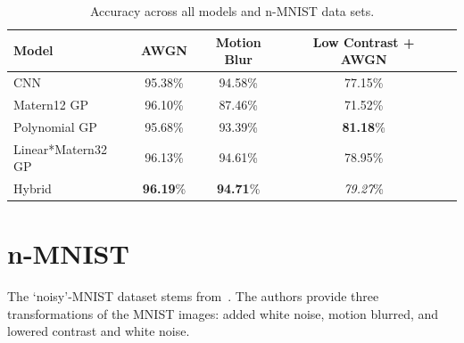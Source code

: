 \documentclass{article}
\begin{document}
\begin{table}[t]
\caption{Accuracy across all models and n-MNIST data sets.}
\vskip 0.15in
\begin{center}
\begin{small}
\begin{sc}
\begin{tabular}{lcccr}
\toprule
Model 				& AWGN 	& Motion Blur	& Low Contrast + AWGN \\
\midrule
CNN    				& 95.38\% 		&	 94.58\%		& 77.15\%   \\
Matern12 GP	 		& 96.10\%		& 87.46\%			& 71.52\%    \\
Polynomial GP    	& 95.68\%		& 93.39\%		& \textbf{81.18}\%  	  \\
Linear*Matern32 GP	& 96.13\%		& 94.61\% 			& 78.95\%   \\
Hybrid    			& \textbf{96.19}\%		& \textbf{94.71}\% 	& \textit{79.27}\%   \\
\bottomrule
\end{tabular}
\end{sc}
\end{small}
\end{center}
\vskip -0.1in
\label{tab:nmnist:accuracies}
\end{table}

\section{n-MNIST}

The `noisy'-MNIST dataset stems from~\citet{basu2017learning}. The authors provide three transformations of the MNIST images: added white noise, motion blurred, and lowered contrast and white noise.
\end{document}
